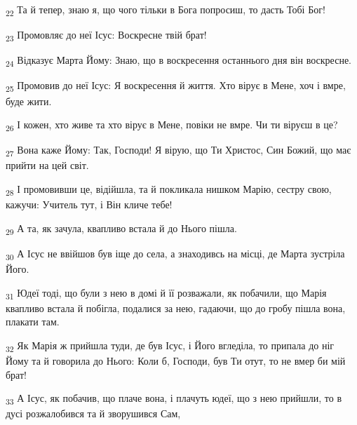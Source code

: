 \begin{tcolorbox}
\textsubscript{22} Та й тепер, знаю я, що чого тільки в Бога попросиш, то дасть Тобі Бог!
\end{tcolorbox}
\begin{tcolorbox}
\textsubscript{23} Промовляє до неї Ісус: Воскресне твій брат!
\end{tcolorbox}
\begin{tcolorbox}
\textsubscript{24} Відказує Марта Йому: Знаю, що в воскресення останнього дня він воскресне.
\end{tcolorbox}
\begin{tcolorbox}
\textsubscript{25} Промовив до неї Ісус: Я воскресення й життя. Хто вірує в Мене, хоч і вмре, буде жити.
\end{tcolorbox}
\begin{tcolorbox}
\textsubscript{26} І кожен, хто живе та хто вірує в Мене, повіки не вмре. Чи ти віруєш в це?
\end{tcolorbox}
\begin{tcolorbox}
\textsubscript{27} Вона каже Йому: Так, Господи! Я вірую, що Ти Христос, Син Божий, що має прийти на цей світ.
\end{tcolorbox}
\begin{tcolorbox}
\textsubscript{28} І промовивши це, відійшла, та й покликала нишком Марію, сестру свою, кажучи: Учитель тут, і Він кличе тебе!
\end{tcolorbox}
\begin{tcolorbox}
\textsubscript{29} А та, як зачула, квапливо встала й до Нього пішла.
\end{tcolorbox}
\begin{tcolorbox}
\textsubscript{30} А Ісус не ввійшов був іще до села, а знаходивсь на місці, де Марта зустріла Його.
\end{tcolorbox}
\begin{tcolorbox}
\textsubscript{31} Юдеї тоді, що були з нею в домі й її розважали, як побачили, що Марія квапливо встала й побігла, подалися за нею, гадаючи, що до гробу пішла вона, плакати там.
\end{tcolorbox}
\begin{tcolorbox}
\textsubscript{32} Як Марія ж прийшла туди, де був Ісус, і Його вгледіла, то припала до ніг Йому та й говорила до Нього: Коли б, Господи, був Ти отут, то не вмер би мій брат!
\end{tcolorbox}
\begin{tcolorbox}
\textsubscript{33} А Ісус, як побачив, що плаче вона, і плачуть юдеї, що з нею прийшли, то в дусі розжалобився та й зворушився Сам,
\end{tcolorbox}
